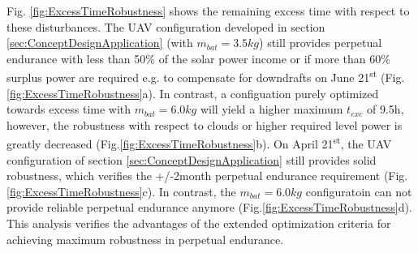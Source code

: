 Fig. \ref{fig:ExcessTimeRobustness} shows the remaining excess time with respect to these disturbances. The UAV configuration developed in section \ref{sec:ConceptDesignApplication} (with $m_{bat}=3.5kg$) still provides perpetual endurance with less than 50\% of the solar power income or if more than 60\% surplus power are required e.g. to compensate for downdrafts on June 21\textsuperscript{st} (Fig.\ref{fig:ExcessTimeRobustness}a). In contrast, a configuation purely optimized towards excess time with $m_{bat}=6.0kg$ will yield a higher maximum $t_{exc}$ of 9.5h, however, the robustness with respect to clouds or higher required level power is greatly decreased (Fig.\ref{fig:ExcessTimeRobustness}b). On April  21\textsuperscript{st}, the UAV configuration of section \ref{sec:ConceptDesignApplication} still provides solid robustness, which verifies the +/-2month perpetual endurance requirement (Fig.\ref{fig:ExcessTimeRobustness}c). In contrast, the $m_{bat}=6.0kg$ configuratoin can not provide reliable perpetual endurance anymore (Fig.\ref{fig:ExcessTimeRobustness}d). This analysis verifies the advantages of the extended optimization criteria for achieving maximum robustness in perpetual endurance.